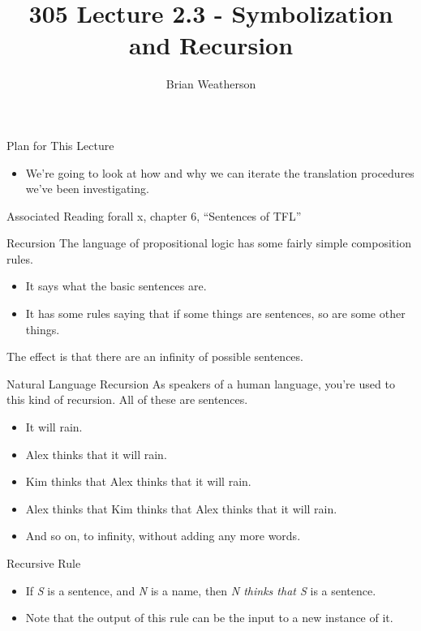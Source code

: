 \documentclass[
  ignorenonframetext,
]{beamer}
\title{305 Lecture 2.3 - Symbolization and Recursion}
\author{Brian Weatherson}
\date{}
\providecommand{\tightlist}{%
  \setlength{\itemsep}{0pt}\setlength{\parskip}{0pt}}
\renewcommand{\,}{\text{, }}
\begin{document}
\frame{\titlepage}

\begin{frame}{Plan for This Lecture}
\protect\hypertarget{plan-for-this-lecture}{}
\begin{itemize}
\tightlist
\item
  We're going to look at how and why we can iterate the translation
  procedures we've been investigating.
\end{itemize}
\end{frame}

\begin{frame}{Associated Reading}
\protect\hypertarget{associated-reading}{}
forall x, chapter 6, ``Sentences of TFL''
\end{frame}

\begin{frame}{Recursion}
\protect\hypertarget{recursion}{}
The language of propositional logic has some fairly simple composition
rules.

\begin{itemize}
\tightlist
\item
  It says what the basic sentences are.
\item
  It has some rules saying that if some things are sentences, so are
  some other things.
\end{itemize}

The effect is that there are an infinity of possible sentences.
\end{frame}

\begin{frame}{Natural Language Recursion}
\protect\hypertarget{natural-language-recursion}{}
As speakers of a human language, you're used to this kind of recursion.
All of these are sentences.

\begin{itemize}[<+->]
\tightlist
\item
  It will rain.
\item
  Alex thinks that it will rain.
\item
  Kim thinks that Alex thinks that it will rain.
\item
  Alex thinks that Kim thinks that Alex thinks that it will rain.
\item
  And so on, to infinity, without adding any more words.
\end{itemize}
\end{frame}

\begin{frame}{Recursive Rule}
\protect\hypertarget{recursive-rule}{}
\begin{itemize}
\tightlist
\item
  If \emph{S} is a sentence, and \emph{N} is a name, then \emph{N thinks
  that S} is a sentence.
\item
  Note that the output of this rule can be the input to a new instance
  of it.
\end{itemize}
\end{frame}
\end{document}

